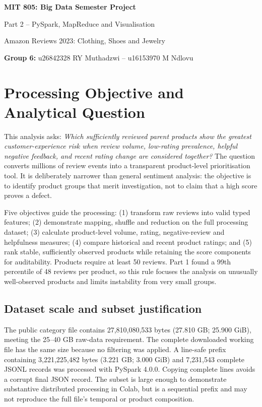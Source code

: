 \documentclass[10pt,a4paper]{article}
\begin{document}
\begin{center}
{\LARGE\bfseries MIT 805: Big Data Semester Project}\par
\vspace{2mm}
{\Large Part 2 -- PySpark, MapReduce and Visualisation}\par
\vspace{2mm}
{\large Amazon Reviews 2023: Clothing, Shoes and Jewelry}\par
\vspace{3mm}
\textbf{Group 6:} u26842328 RY Muthadzwi -- u16153970 M Ndlovu
\end{center}

\section{Processing Objective and Analytical Question}

This analysis asks: \emph{Which sufficiently reviewed parent products show the greatest customer-experience risk when review volume, low-rating prevalence, helpful negative feedback, and recent rating change are considered together?} The question converts millions of review events into a transparent product-level prioritisation tool. It is deliberately narrower than general sentiment analysis: the objective is to identify product groups that merit investigation, not to claim that a high score proves a defect.

Five objectives guide the processing: (1) transform raw reviews into valid typed features; (2) demonstrate mapping, shuffle and reduction on the full processing dataset; (3) calculate product-level volume, rating, negative-review and helpfulness measures; (4) compare historical and recent product ratings; and (5) rank stable, sufficiently observed products while retaining the score components for auditability. Products require at least 50 reviews. Part 1 found a 99th percentile of 48 reviews per product, so this rule focuses the analysis on unusually well-observed products and limits instability from very small groups.

\subsection{Dataset scale and subset justification}

The public category file contains 27,810,080,533 bytes (27.810 GB; 25.900 GiB), meeting the 25--40 GB raw-data requirement. The complete downloaded working file has the same size because no filtering was applied. A line-safe prefix containing 3,221,225,482 bytes (3.221 GB; 3.000 GiB) and 7,231,543 complete JSONL records was processed with PySpark 4.0.0. Copying complete lines avoids a corrupt final JSON record. The subset is large enough to demonstrate substantive distributed processing in Colab, but is a sequential prefix and may not reproduce the full file's temporal or product composition.
\end{document}
